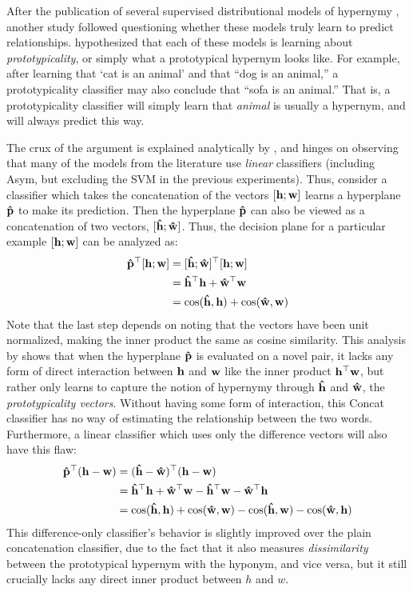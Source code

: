 After the publication of several supervised distributional models of hypernymy
\cite{baroni:2011:gems,fu:2014:acl,roller:2014:coling,weeds:2014:coling},
another study followed questioning whether these models truly learn to predict
relationships.  hypothesized that each of these models
is learning about {\em prototypicality}, or simply what a prototypical
hypernym looks like. For example, after learning that `cat is an animal'
and that ``dog is an animal,'' a prototypicality classifier may also conclude
that ``sofa is an animal.'' That is, a prototypicality classifier will
simply learn that {\em animal} is usually a hypernym, and will always
predict this way.

The crux of the argument is explained analytically by
, and hinges on observing that many of the models from
the literature use {\em linear} classifiers (including Asym, but excluding the
SVM in the previous experiments). Thus, consider a classifier which takes the
concatenation of the vectors $[{\mathbf{h}}; {\mathbf{w}}]$ learns a hyperplane ${\mathbf{\hat p}}$ to make
its prediction. Then the hyperplane ${\mathbf{\hat p}}$ can also be viewed as a
concatenation of two vectors, $[{\mathbf{\hat h}}; {\mathbf{\hat w}}]$. Thus, the decision plane for a
particular example $[{\mathbf{h}}; {\mathbf{w}}]$ can be analyzed as:
\begin{align*}
  {\mathbf{\hat p}}^\top [{\mathbf{h}}; {\mathbf{w}}] & = [{\mathbf{\hat h}}; {\mathbf{\hat w}}]^\top [{\mathbf{h}}; {\mathbf{w}}]\\
  & = {\mathbf{\hat h}}^\top{\mathbf{h}} + {\mathbf{\hat w}}^\top{\mathbf{w}}\\
  & = \mbox{cos}({\mathbf{\hat h}}, {\mathbf{h}}) + \mbox{cos}({\mathbf{\hat w}}, {\mathbf{w}})
\end{align*}
Note that the last step depends on noting that the vectors have been unit
normalized, making the inner product the same as cosine similarity.  This
analysis by  shows that when the hyperplane ${\mathbf{\hat p}}$
is evaluated on a novel pair, it lacks any form of direct interaction between
${\mathbf{h}}$ and ${\mathbf{w}}$ like the inner product ${\mathbf{h}}^{\top}{\mathbf{w}}$, but rather only learns to
capture the notion of hypernymy through ${\mathbf{\hat h}}$ and ${\mathbf{\hat w}}$, the {\em
prototypicality vectors}.  Without having some form of interaction, this Concat
classifier has no way of estimating the relationship between the two words.
Furthermore, a linear classifier which uses only the difference vectors will
also have this flaw:
\begin{align*}
  {\mathbf{\hat p}}^{\top} ({\mathbf{h}} - {\mathbf{w}}) & = ({\mathbf{\hat h}} - {\mathbf{\hat w}})^{\top} ({\mathbf{h}} - {\mathbf{w}})\\
  & = {\mathbf{\hat h}}^{\top} {\mathbf{h}} + {\mathbf{\hat w}}^{\top} {\mathbf{w}} - {\mathbf{\hat h}}^{\top} {\mathbf{w}} - {\mathbf{\hat w}}^{\top} {\mathbf{h}}\\
  & = \mbox{cos}({\mathbf{\hat h}}, {\mathbf{h}}) + \mbox{cos}({\mathbf{\hat w}}, {\mathbf{w}}) - \mbox{cos}({\mathbf{\hat h}}, {\mathbf{w}}) - \mbox{cos}({\mathbf{\hat w}}, {\mathbf{h}})
\end{align*}
This difference-only classifier's behavior is slightly improved over the plain
concatenation classifier, due to the fact that it also measures {\em
dissimilarity} between the prototypical hypernym with the hyponym, and vice
versa, but it still crucially lacks any direct inner product between $h$ and
$w$.

